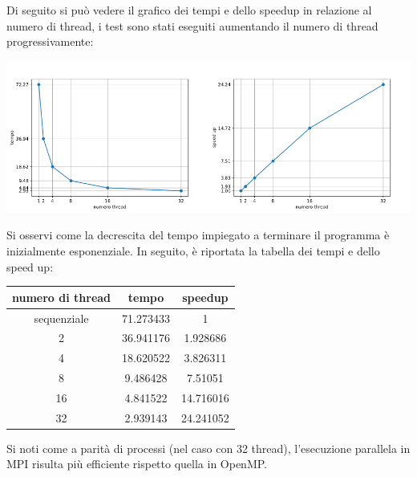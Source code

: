 \documentclass[12pt,openany]{report}
\begin{document}
Di seguito si può vedere il grafico dei tempi e dello speedup in relazione al numero di thread, i test sono stati eseguiti aumentando il numero di thread progressivamente:\begin{center}
\includegraphics[width=0.5\textwidth ]{images/tempi_OpenMP.pdf}\includegraphics[width=0.5\textwidth ]{images/speedup_OpenMP.pdf}
\end{center}
Si osservi come la decrescita del tempo impiegato a terminare il programma è inizialmente esponenziale. In seguito, è riportata la tabella dei tempi e dello speed up:\begin{center}
    \begin{tabular}{|c|c|c|}
        \hline
        \rowcolor[HTML]{EFEFEF} 
        numero di  thread & tempo     & speedup   \\ \hline
        sequenziale       & 71.273433 & 1         \\ \hline
        2                 & 36.941176 & 1.928686  \\ \hline
        4                 & 18.620522 & 3.826311  \\ \hline
        8                 & 9.486428  & 7.51051   \\ \hline
        16                & 4.841522  & 14.716016 \\ \hline
        32                & 2.939143  & 24.241052 \\ \hline
        \end{tabular}
\end{center}
Si noti come a parità di processi (nel caso con 32 thread), l'esecuzione parallela in MPI risulta più efficiente rispetto quella in OpenMP.
\end{document}
